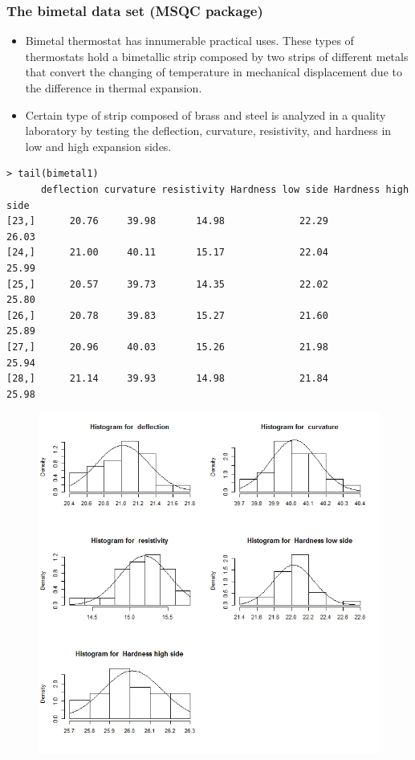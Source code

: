 \documentclass[]{article}
\begin{document}
\subsubsection{The bimetal data set (MSQC package)}
{\large
\begin{itemize}
\item Bimetal thermostat has innumerable practical uses. These types of thermostats hold
a bimetallic strip composed by two strips of different metals that convert the
changing of temperature in mechanical displacement due to the difference in
thermal expansion.
\item Certain type of strip composed of brass and steel is analyzed in a quality
laboratory by testing the deflection, curvature, resistivity, and hardness in low
and high expansion sides.
\end{itemize}
\begin{framed}
\begin{verbatim}
> tail(bimetal1)
      deflection curvature resistivity Hardness low side Hardness high side
[23,]      20.76     39.98       14.98             22.29             26.03
[24,]      21.00     40.11       15.17             22.04             25.99
[25,]      20.57     39.73       14.35             22.02             25.80
[26,]      20.78     39.83       15.27             21.60             25.89
[27,]      20.96     40.03       15.26             21.98             25.94
[28,]      21.14     39.93       14.98             21.84             25.98

\end{verbatim}
\end{framed}
}
\newpage
\begin{figure}[h!]
\centering
\includegraphics[width=0.9\linewidth]{./MSQC-bimetal1hist}
\caption{}
\label{fig:MSQC-bimetal1hist}
\end{figure}
\end{document}

